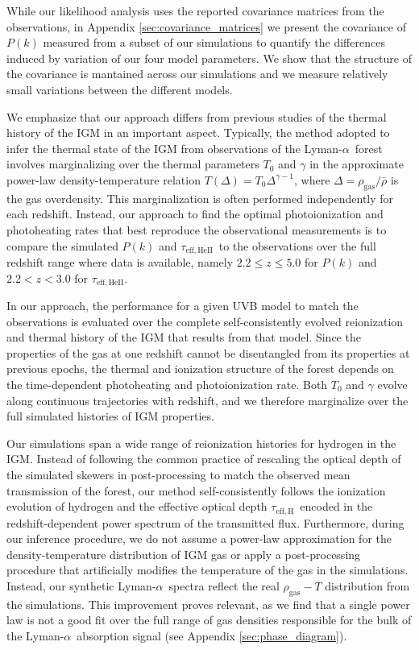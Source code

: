 \documentclass[twocolumn]{aastex62}
\newcommand\Lya{Lyman-$\alpha$}
\newcommand\taueffH{$\tau_{\mathrm{eff,H}}$~}
\newcommand\taueffHe{$\tau_{\mathrm{eff,HeII}}$~}
\newcommand\taueffHen{$\tau_{\mathrm{eff,HeII}}$}
\begin{document}
While our likelihood 
analysis uses the reported covariance matrices from the observations, in Appendix \ref{sec:covariance_matrices} we present the 
covariance of $P(k)$ measured from a subset of our simulations to quantify the differences induced by variation of our four model 
parameters. We show that the structure of the covariance is mantained across our simulations and we measure 
relatively small variations between 
the different models.       

We emphasize that our approach differs from previous studies of 
the thermal history of the IGM 
\citep[e.g.,][]{ bolton2014a, Nasir+2016, hiss2018a,  boera2019a,   walther2019a, gaikwad2020b} in an important aspect. Typically,
the method  adopted to infer the thermal state of the IGM from observations of the \Lya\ forest involves marginalizing over the thermal
parameters $T_0$ and $\gamma$ in the approximate power-law density-temperature relation \citep{hui1997a} $T(\Delta) = T_0 \Delta^{\gamma-1}$, where 
$\Delta = \rho_\mathrm{gas}/\bar{\rho}$ is the gas overdensity.  This marginalization is often performed independently for each redshift.
Instead, our approach to find the optimal photoionization and photoheating rates that best reproduce the observational measurements is to compare the
simulated $P(k)$ and \taueffHe to the observations over the full redshift range where data is available, namely $2.2 \leq z \leq 5.0$ for 
$P(k)$ and $2.2 < z < 3.0$ for \taueffHen. 

In our approach, the performance for a given UVB model to match the observations is  evaluated over the complete
self-consistently evolved reionization and thermal history of the IGM that results from that model. Since the properties 
of the gas at one redshift cannot be disentangled from its properties at previous epochs, the thermal and ionization 
structure of the forest depends on the time-dependent photoheating and photoionization rate.
Both $T_0$ and $\gamma$ evolve along continuous trajectories with redshift, and we therefore 
marginalize  over the full simulated histories of IGM properties.

Our simulations span a wide range of reionization histories for hydrogen in the IGM. 
Instead of following the common practice of rescaling the optical  depth of the simulated skewers in post-processing to 
match the observed mean transmission of the forest, our method self-consistently follows the ionization evolution of 
hydrogen and the effective optical depth \taueffH encoded in the redshift-dependent power spectrum of the transmitted flux.
Furthermore, during our inference procedure, we do not assume a power-law 
approximation for the density-temperature distribution of IGM gas or
apply a post-processing procedure  that artificially modifies the temperature of the gas in the simulations. 
Instead, our synthetic \Lya\ spectra reflect the real $\rho_\mathrm{gas}-T$ distribution from the simulations.
This improvement proves relevant, as we find that a single power law is not a good fit over the full range of 
gas densities responsible for the bulk of the  \Lya\ absorption signal (see Appendix \ref{sec:phase_diagram}).
\end{document}
